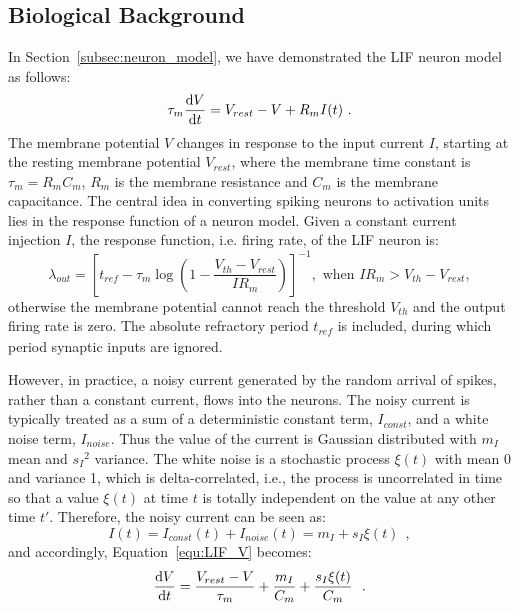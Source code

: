	
	
	\subsection{Biological Background}
	\label{sec:siergert}
	In Section~\ref{subsec:neuron_model}, we have demonstrated the  LIF neuron model as follows:
	\begin{equation}
	\tau_m \frac{\mathrm{d} V}{\mathrm{d} t}=V_{rest} - V + R_{m} I(t) ~.
	\label{equ:LIF_V}
	\end{equation}
	The membrane potential $V$ changes in response to the input current $I$, starting at the resting membrane potential $V_{rest}$, where the membrane time constant is $\tau_m = R_mC_m$, $R_m$ is the membrane resistance and $C_m$ is the membrane capacitance.
	The central idea in converting spiking neurons to activation units lies in the response function of a neuron model.
	Given a constant current injection $I$, the response function, i.e. firing rate, of the LIF neuron is:
	\begin{equation}
	\lambda_\mathit{out}=
	\left [ t_\mathit{ref}-\tau_m\log \left ( 1-\frac{V_{th}-V_\mathit{rest}}{IR_m}  \right )\right ]^{-1}, \textrm{~when~} IR_m>V_{th}-V_{rest},
	\label{equ:consI}
	\end{equation}
	otherwise the membrane potential cannot reach the threshold $V_{th}$ and the output firing rate is zero. 
	The absolute refractory period $t_\mathit{ref}$ is included, during which period synaptic inputs are ignored.
	
	However, in practice, a noisy current generated by the random arrival of spikes, rather than a constant current, flows into the neurons.
	The noisy current is typically treated as a sum of a deterministic constant term, $I_{const}$, and a white noise term, $I_{noise}$.
	Thus the value of the current is Gaussian distributed with $m_I$ mean and ${s_I}^2$ variance.
	The white noise is a stochastic process $\xi(t)$ with mean 0 and variance 1, which is delta-correlated, i.e., the process is uncorrelated in time so that a value $\xi(t)$ at time $t$ is totally independent on the value at any other time $t'$.
	Therefore, the noisy current can be seen as:
	\begin{equation}
	I(t) = I_{const}(t)+I_{noise}(t) = m_I + s_I\xi(t)~~,
	\label{equ:noisyI}
	\end{equation}
	and accordingly, Equation~\ref{equ:LIF_V} becomes:
	\begin{equation}
	\frac{\mathrm{d} V}{\mathrm{d} t}=\frac{V_{rest} - V}{\tau_m } + \frac{m_I}{C_m} + \frac{s_I\xi(t)}{C_m}~~.
	\label{equ:LIF_V2}
	\end{equation}
	
